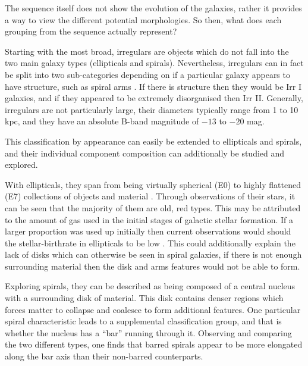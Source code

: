 \documentclass[12pt, twocolumn]{revtex4}    %
\begin{document}
The sequence itself does not show the evolution of the galaxies, rather it provides a way to view the different potential morphologies. So then, what does each grouping from the sequence actually represent? 

Starting with the most broad, irregulars are objects which do not fall into the two main galaxy types (ellipticals and spirals). Nevertheless, irregulars can in fact be split into two sub-categories depending on if a particular galaxy appears to have structure, such as spiral arms \citep{carroll_astro}. If there is structure then they would be Irr I galaxies, and if they appeared to be extremely disorganised then Irr II. Generally, irregulars are not particularly large, their diameters typically range from 1 to 10 kpc, and they have an absolute B-band magnitude of $-13$ to $-20$ mag.


This classification by appearance can easily be extended to ellipticals and spirals, and their individual component composition can additionally be studied and explored. 

With ellipticals, they span from being virtually spherical (E0) to highly flattened (E7) collections of objects and material \citep{moore_databook}. Through observations of their stars, it can be seen that the majority of them are old, red types. This may be attributed to the amount of gas used in the initial stages of galactic stellar formation. If a larger proportion was used up initially then current observations would should the stellar-birthrate in ellipticals to be low \citep{carroll_astro}. This could additionally explain the lack of disks which can otherwise be seen in spiral galaxies, if there is not enough surrounding material then the disk and arms features would not be able to form.

Exploring spirals, they can be described as being composed of a central nucleus with a surrounding disk of material. This disk contains denser regions which forces matter to collapse and coalesce to form additional features. One particular spiral characteristic leads to a supplemental classification group, and that is whether the nucleus has a ``bar'' running through it. Observing and comparing the two different types, one finds that barred spirals appear to be more elongated along the bar axis than their non-barred counterparts. 
\end{document}
